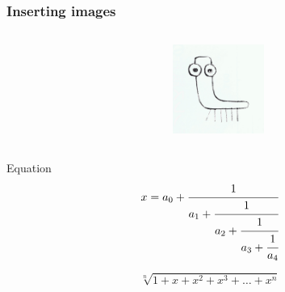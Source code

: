 \begin{frame}[fragile]
  \frametitle{Inserting images}
  \begin{columns}
    \begin{column}{0.67\textwidth}
      
    \end{column}
    \begin{column}{0.33\textwidth}
      \includegraphics[width = 3cm]{./fig/logo}
    \end{column}
  \end{columns}
\end{frame}

\begin{frame}{Equation}
  \begin{equation}
    x = a_0 + \cfrac{1}{a_1 
      + \cfrac{1}{a_2 
        + \cfrac{1}{a_3 + \cfrac{1}{a_4} } } }
  \end{equation}

  \[
  \sqrt[n]{1+x+x^2+x^3+\dots+x^n}
  \]
\end{frame}

